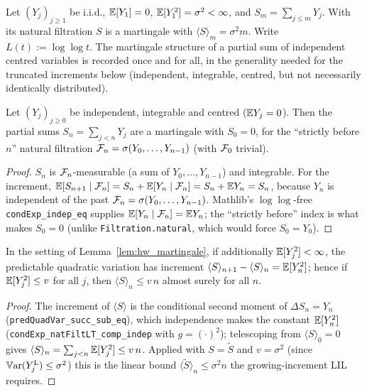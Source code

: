 Let $(Y_j)_{j\ge1}$ be i.i.d., $\mathbb{E}[Y_1]=0$, $\mathbb{E}[Y_1^2]=\sigma^2<\infty$, and
$S_m=\sum_{j\le m}Y_j$. With its natural filtration $S$ is a martingale with
$\langle S\rangle_m=\sigma^2 m$. Write $L(t):=\log\log t$. The martingale structure of a partial
sum of independent centred variables is recorded once and for all, in the generality needed for the
truncated increments below (independent, integrable, centred, but not necessarily identically
distributed).

\begin{lemma}\label{lem:hw_martingale}
\leanok
Let $(Y_j)_{j\ge0}$ be independent, integrable and centred ($\mathbb{E} Y_j=0$). Then the partial sums
$S_n=\sum_{j<n}Y_j$ are a martingale with $S_0=0$, for the ``strictly before $n$'' natural filtration
$\mathcal{F}_n=\sigma(Y_0,\dots,Y_{n-1})$ (with $\mathcal{F}_0$ trivial).
\end{lemma}
\begin{proof}\leanok
$S_n$ is $\mathcal{F}_n$-measurable (a sum of $Y_0,\dots,Y_{n-1}$) and integrable. For the increment,
$\mathbb{E}[S_{n+1}\mid\mathcal{F}_n]=S_n+\mathbb{E}[Y_n\mid\mathcal{F}_n]=S_n+\mathbb{E} Y_n=S_n$, because $Y_n$ is independent of the
past $\mathcal{F}_n=\sigma(Y_0,\dots,Y_{n-1})$. Mathlib's $\log\log$-free
\texttt{condExp\_indep\_eq} supplies $\mathbb{E}[Y_n\mid\mathcal{F}_n]=\mathbb{E} Y_n$; the ``strictly before'' index is
what makes $S_0=0$ (unlike \texttt{Filtration.natural}, which would force $S_0=Y_0$).
\end{proof}

\begin{lemma}\label{lem:hw_qv}
\leanok
{}
In the setting of Lemma~\ref{lem:hw_martingale}, if additionally $\mathbb{E}[Y_j^2]<\infty$, the predictable
quadratic variation has increment $\langle S\rangle_{n+1}-\langle S\rangle_n=\mathbb{E}[Y_n^2]$; hence if
$\mathbb{E}[Y_j^2]\le v$ for all $j$, then $\langle S\rangle_n\le v\,n$ almost surely for all $n$.
\end{lemma}
\begin{proof}\leanok
The increment of $\langle S\rangle$ is the conditional second moment of $\Delta S_n=Y_n$
(\texttt{predQuadVar\_succ\_sub\_eq}), which independence makes the constant $\mathbb{E}[Y_n^2]$
(\texttt{condExp\_natFiltLT\_comp\_indep} with $g=(\cdot)^2$); telescoping from $\langle S\rangle_0=0$
gives $\langle S\rangle_n=\sum_{j<n}\mathbb{E}[Y_j^2]\le v\,n$. Applied with $S=\tilde S$ and $v=\sigma^2$
(since $\mathbb{V}\mathrm{ar}(Y_j^{\mathrm L})\le\sigma^2$) this is the linear bound $\langle\tilde S\rangle_n\le
\sigma^2 n$ the growing-increment LIL requires.
\end{proof}

